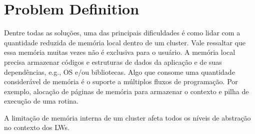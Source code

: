 \section{Problem Definition}
\label{sec:problem}

	Dentre todas as soluções, uma das principais dificuldades é como lidar
	com a quantidade reduzida de memória local dentro de um cluster. Vale
	ressaltar que essa memória muitas vezes não é exclusiva para o usuário.
	A memória local precisa armazenar códigos e estruturas de  dados da
	aplicação e de suas dependências, e.g., OS e/ou bibliotecas.
	Algo que consome uma quantidade considerável de memória é o suporte
	a múltiplos fluxos de programação. Por exemplo, alocação de páginas de
	memória para armazenar o contexto e pilha de execução de uma rotina.

	A limitação de memória interna de um cluster afeta todos os níveis de abstração no contexto dos LWs. 

